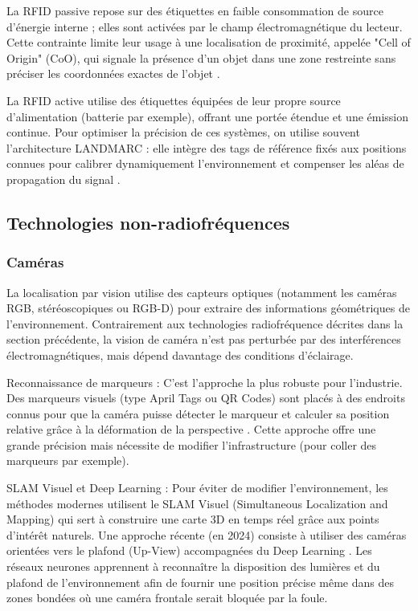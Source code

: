 \documentclass[11pt, a4paper]{article}
\begin{document}
La RFID passive repose sur des étiquettes en faible consommation de source d'énergie interne ; elles sont activées par le champ électromagnétique du lecteur. Cette contrainte limite leur usage à une localisation de proximité, appelée "Cell of Origin" (CoO), qui signale la présence d'un objet dans une zone restreinte sans préciser les coordonnées exactes de l’objet \cite{obeidatReviewIndoorLocalization2021}.

La RFID active utilise des étiquettes équipées de leur propre source d’alimentation (batterie par exemple), offrant une portée étendue et une émission continue. Pour optimiser la précision de ces systèmes, on utilise souvent l'architecture LANDMARC : elle intègre des tags de référence fixés aux positions connues pour calibrer dynamiquement l'environnement et compenser les aléas de propagation du signal \cite{obeidatReviewIndoorLocalization2021}.

\subsection{Technologies non-radiofréquences}

\subsubsection{Caméras}

La localisation par vision utilise des capteurs optiques (notamment les caméras RGB, stéréoscopiques ou RGB-D) pour extraire des informations géométriques de l'environnement. Contrairement aux technologies radiofréquence décrites dans la section précédente, la vision de caméra n'est pas perturbée par des interférences électromagnétiques, mais dépend davantage des conditions d'éclairage.

Reconnaissance de marqueurs : C'est l'approche la plus robuste pour l'industrie. Des marqueurs visuels (type April Tags ou QR Codes) sont placés à des endroits connus pour que la caméra puisse détecter le marqueur et calculer sa position relative grâce à la déformation de la perspective \cite{chenUpViewVisualBasedIndoor2024}. Cette approche offre une grande précision mais nécessite de modifier l'infrastructure (pour coller des marqueurs par exemple).

SLAM Visuel et Deep Learning : Pour éviter de modifier l'environnement, les méthodes modernes utilisent le SLAM Visuel (Simultaneous Localization and Mapping) qui sert à construire une carte 3D en temps réel grâce aux points d'intérêt naturels. Une approche récente (en 2024) consiste à utiliser des caméras orientées vers le plafond (Up-View) accompagnées du Deep Learning \cite{chenUpViewVisualBasedIndoor2024}. Les réseaux neurones apprennent à reconnaître la disposition des lumières et du plafond de l'environnement afin de fournir une position précise même dans des zones bondées où une caméra frontale serait bloquée par la foule.
\end{document}
